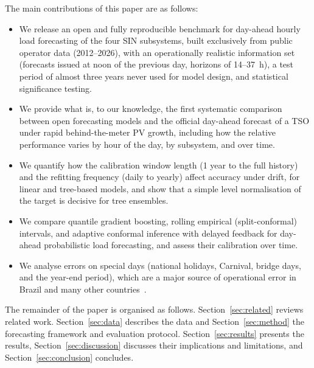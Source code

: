 The main contributions of this paper are as follows:
\begin{itemize}
\item We release an open and fully reproducible benchmark for day-ahead hourly load forecasting of the four SIN subsystems, built exclusively from public operator data (2012--2026), with an operationally realistic information set (forecasts issued at noon of the previous day, horizons of 14--37~h), a test period of almost three years never used for model design, and statistical significance testing.
\item We provide what is, to our knowledge, the first systematic comparison between open forecasting models and the official day-ahead forecast of a TSO under rapid behind-the-meter PV growth, including how the relative performance varies by hour of the day, by subsystem, and over time.
\item We quantify how the calibration window length (1 year to the full history) and the refitting frequency (daily to yearly) affect accuracy under drift, for linear and tree-based models, and show that a simple level normalisation of the target is decisive for tree ensembles.
\item We compare quantile gradient boosting, rolling empirical (split-conformal) intervals, and adaptive conformal inference with delayed feedback for day-ahead probabilistic load forecasting, and assess their calibration over time.
\item We analyse errors on special days (national holidays, Carnival, bridge days, and the year-end period), which are a major source of operational error in Brazil and many other countries~\cite{ziel2018holidays}.
\end{itemize}

The remainder of the paper is organised as follows. Section~\ref{sec:related} reviews related work. Section~\ref{sec:data} describes the data and Section~\ref{sec:method} the forecasting framework and evaluation protocol. Section~\ref{sec:results} presents the results, Section~\ref{sec:discussion} discusses their implications and limitations, and Section~\ref{sec:conclusion} concludes.
